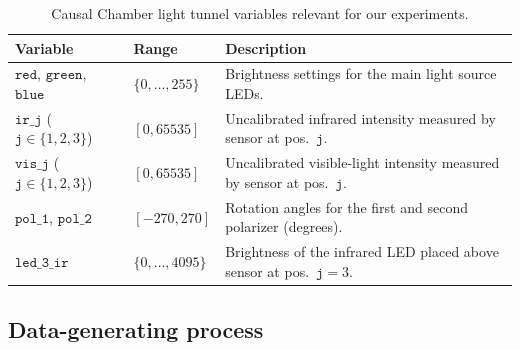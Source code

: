 \begin{table}[t]
    \centering
    \caption{Causal Chamber light tunnel variables relevant for our experiments. %
    }
    \label{tab:variables}
    \small
    \begin{tabular}{@{}llp{8.5cm}@{}}
        \toprule
        \textbf{Variable} & \textbf{Range} & \textbf{Description} \\
        \midrule
        $\mathtt{red}$, $\mathtt{green}$, $\mathtt{blue}$ & $\{0, \dots, 255\}$
            & Brightness settings for the main light source LEDs. \\
        $\mathtt{ir\_j}$ ($\mathtt{j} \in \{1,2,3\}$) & $[0, 65535]$
            & Uncalibrated infrared intensity measured by sensor at pos.\ $\mathtt{j}$. \\
        $\mathtt{vis\_j}$ ($\mathtt{j} \in \{1,2,3\}$) & $[0, 65535]$
            & Uncalibrated visible-light intensity measured by sensor at pos.\ $\mathtt{j}$. \\
        $\mathtt{pol\_1}$, $\mathtt{pol\_2}$ & $[-270, 270]$
            & Rotation angles for the first and second polarizer (degrees). \\
        $\mathtt{led\_3\_ir}$ & $\{0, \dots, 4095\}$
            & Brightness of the infrared LED placed above sensor at pos.\ $\mathtt{j}=3$. \\
        \bottomrule
    \end{tabular}
\end{table}
\subsection{Data-generating process} \label{app:causal_chambers_data}

